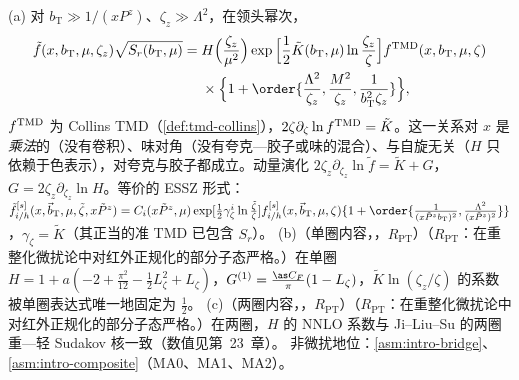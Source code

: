 \begin{theorem}\label{thm:lamet-quasi-tmd}
(a) 对 $b_{\mathrm T}\gg1/(xP^z)$、$\zeta_z\gg\Lambda^2$，在领头幂次，
\begin{equation}\label{eq:lamet-qtmd}
\begin{split}
\tilde f(x,b_{\mathrm T},\mu,\zeta_z)\sqrt{S_r(b_{\mathrm T},\mu)}={}&H\Big(\frac{\zeta_z}{\mu^2}\Big)\exp\Big[\frac12\tilde K(b_{\mathrm T},\mu)\ln\frac{\zeta_z}\zeta\Big]f^{\rm TMD}(x,b_{\mathrm T},\mu,\zeta)\\
&\times\Big\{1+\order{\frac{\Lambda^2}{\zeta_z},\frac{M^2}{\zeta_z},\frac1{b_{\mathrm T}^2\zeta_z}}\Big\},
\end{split}
\end{equation}%
$f^{\rm TMD}$ 为 Collins TMD（\cref{def:tmd-collins}），$2\zeta\partial_\zeta\ln f^{\rm TMD}=\tilde K$。这一关系对 $x$ 是\emph{乘法}的（没有卷积）、味对角（没有夸克—胶子或味的混合）、与自旋无关（$H$ 只依赖于色表示），对夸克与胶子都成立。动量演化 $2\zeta_z\partial_{\zeta_z}\ln\tilde f=\tilde K+G$，$G=2\zeta_z\partial_{\zeta_z}\ln H$。等价的 ESSZ 形式：$\tilde f^{[s]}_{i/h}(x,\vec b_{\mathrm T},\mu,\tilde\zeta,x\tilde P^z)=C_i(x\tilde P^z,\mu)\exp[\frac12\gamma^i_\zeta\ln\frac{\tilde\zeta}\zeta]f^{[s]}_{i/h}(x,\vec b_{\mathrm T},\mu,\zeta)\{1+\order{\frac1{(x\tilde P^zb_{\mathrm T})^2},\frac{\Lambda^2}{(x\tilde P^z)^2}}\}$，$\gamma_\zeta=\tilde K$（其正当的准 TMD 已包含 $S_r$）。
(b)（单圈内容，\tagR，$R_{\mathrm{PT}}$）（$R_{\mathrm{PT}}$：在重整化微扰论中对红外正规化的部分子态严格。）在单圈 $H=1+a(-2+\frac{\pi^2}{12}-\frac12L_\zeta^2+L_\zeta)$，$G^{(1)}=\frac{\as C_F}\pi(1-L_\zeta)$，$\tilde K\ln(\zeta_z/\zeta)$ 的系数被单圈表达式唯一地固定为 $\frac12$。
(c)（两圈内容，\tagR，$R_{\mathrm{PT}}$）（$R_{\mathrm{PT}}$：在重整化微扰论中对红外正规化的部分子态严格。）在两圈，$H$ 的 NNLO 系数\cite{delRio:2023pse}与 Ji--Liu--Su 的两圈重—轻 Sudakov 核一致（数值见第~23~章）。
非微扰地位：\cref{asm:intro-bridge}、\cref{asm:intro-composite}（MA0、MA1、MA2）。
\end{theorem}

